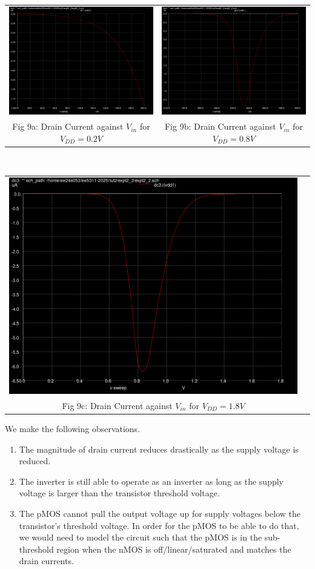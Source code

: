 \documentclass[12pt,a4paper]{article}
\begin{document}
\begin{center}
\begin{tabular}{cc}
     \includegraphics[width=0.49\linewidth]{tut2/reports/media/expt2_2_ids_0_2.png} &
     \includegraphics[width=0.49\linewidth]{tut2/reports/media/expt2_2_ids_0_8.png} \\
     Fig 9a: Drain Current against $V_{in}$ for $V_{DD} = 0.2V$ & Fig 9b: Drain Current against $V_{in}$ for $V_{DD} = 0.8V$
\end{tabular}
\\
\begin{tabular}{cc}
     \includegraphics[width=0.49\linewidth]{tut2/reports/media/expt2_2_ids_1_8.png} &
     \\ Fig 9c: Drain Current against $V_{in}$ for $V_{DD} = 1.8V$
\end{tabular}
\end{center}

\noindent We make the following observations.

\begin{enumerate}
    \item The magnitude of drain current reduces drastically as the supply voltage is reduced.
    \item The inverter is still able to operate as an inverter as long as the supply voltage is larger than the transistor threshold voltage.
    \item The pMOS cannot pull the output voltage up for supply voltages below the transistor's threshold voltage. In order for the pMOS to be able to do that, we would need to model the circuit such that the pMOS is in the sub-threshold region when the nMOS is off/linear/saturated and matches the drain currents.
\end{enumerate}
\end{document}
